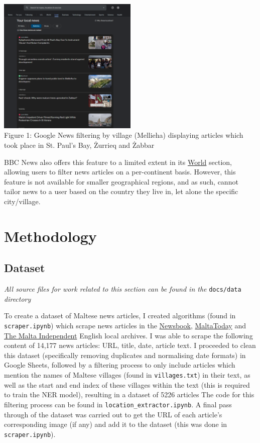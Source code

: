 \documentclass[a4paper, oneside, 11pt]{article}
\begin{document}
\begin{multicols*}{2}
  \begin{center}
    \includegraphics[width=0.5\textwidth]{./figures/googlenewsmellieha.png} \\
    Figure 1: Google News filtering by village (Mellieha) displaying articles which took place in St. Paul's Bay, Żurrieq and Żabbar
  \end{center}


  BBC News also offers this feature to a limited extent in its \href{https://www.bbc.com/news/world}{World} section, allowing users to filter news articles on a per-continent basis. However, this feature is not available for smaller geographical regions, and as such, cannot tailor news to a user based on the country they live in, let alone the specific city/village.


  \section{Methodology}
  \subsection{Dataset}
  \textit{All source files for work related to this section can be found in the} \verb|docs/data| \textit{directory}

  \medskip

  To create a dataset of Maltese news articles, I created algorithms (found in \verb|scraper.ipynb|) which scrape news articles in the \href{https://newsbook.com.mt/}{Newsbook}, \href{https://www.maltatoday.com.mt/}{MaltaToday} and \href{https://www.independent.com.mt/}{The Malta Independent} English local archives. I was able to scrape the following content of 14,177 news articles: URL, title, date, article text. I proceeded to clean this dataset (specifically removing duplicates and normalising date formats) in Google Sheets, followed by a filtering process to only include articles which mention the names of Maltese villages (found in \verb|villages.txt|) in their text, as well as the start and end index of these villages within the text (this is required to train the NER model), resulting in a dataset of 5226 articles The code for this filtering process can be found in \verb|location_extractor.ipynb|. A final pass through of the dataset was carried out to get the URL of each article's corresponding image (if any) and add it to the dataset (this was done in \verb|scraper.ipynb|).


\end{multicols*}
\end{document}
